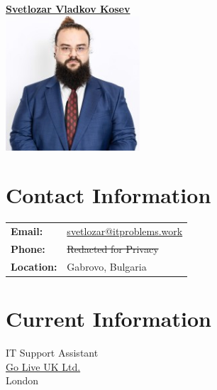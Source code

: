 \documentclass[letterpaper, 10pt]{article}
\newcommand{\redact}[1]{\textcolor{black!40}{#1}}
\begin{document}
	\pagestyle{empty} %
	
	\begin{center}
		\begin{minipage}[t]{0.5\textwidth}
			\centering
			\Large\textbf{\href{https://www.linkedin.com/in/svetlozar-kosev-m-sc-it-278058144/}{Svetlozar
					Vladkov Kosev}}\\[2ex]
			\includegraphics[width=5cm, height=5cm, keepaspectratio]{photo3.png}
		\end{minipage}%
		\begin{minipage}[t]{0.5\textwidth}
			\section*{Contact Information}
			\begin{tabular}{@{}l l}
				\textbf{Email:}   & \href{mailto:svetlozar@itproblems.work}{svetlozar@itproblems.work} \\
				\textbf{Phone:} & \redact{\st{Redacted for Privacy}} \\
				\textbf{Location:} & Gabrovo, Bulgaria                                                  \\
			\end{tabular}
			
			\section*{Current Information}
			IT Support Assistant \\ \href{https://www.goliveuk.com/}{Go Live UK Ltd.}
			\\ London \\
		\end{minipage}
	\end{center}
	
\end{document}
